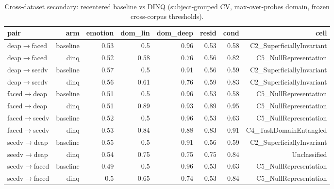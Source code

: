 \begin{table}[t]
\centering
\caption{Cross-dataset secondary: recentered baseline vs DINQ (subject-grouped CV, max-over-probes domain, frozen cross-corpus thresholds).}
\label{tab:xcorp}
\begin{tabular}{lrrrrrrr}
\toprule
pair & arm & emotion & dom\_lin & dom\_deep & resid & cond & cell \\
\midrule
deap$\rightarrow$faced & baseline & 0.53 & 0.5 & 0.96 & 0.53 & 0.58 & C2\_SuperficiallyInvariant \\
deap$\rightarrow$faced & dinq & 0.52 & 0.58 & 0.76 & 0.56 & 0.82 & C5\_NullRepresentation \\
deap$\rightarrow$seedv & baseline & 0.57 & 0.5 & 0.91 & 0.56 & 0.59 & C2\_SuperficiallyInvariant \\
deap$\rightarrow$seedv & dinq & 0.56 & 0.61 & 0.76 & 0.59 & 0.83 & C2\_SuperficiallyInvariant \\
faced$\rightarrow$deap & baseline & 0.51 & 0.5 & 0.96 & 0.53 & 0.58 & C5\_NullRepresentation \\
faced$\rightarrow$deap & dinq & 0.51 & 0.89 & 0.93 & 0.89 & 0.95 & C5\_NullRepresentation \\
faced$\rightarrow$seedv & baseline & 0.52 & 0.5 & 0.96 & 0.53 & 0.63 & C5\_NullRepresentation \\
faced$\rightarrow$seedv & dinq & 0.53 & 0.84 & 0.88 & 0.83 & 0.91 & C4\_TaskDomainEntangled \\
seedv$\rightarrow$deap & baseline & 0.55 & 0.5 & 0.91 & 0.56 & 0.59 & C2\_SuperficiallyInvariant \\
seedv$\rightarrow$deap & dinq & 0.54 & 0.75 & 0.75 & 0.75 & 0.84 & Unclassified \\
seedv$\rightarrow$faced & baseline & 0.49 & 0.5 & 0.96 & 0.53 & 0.63 & C5\_NullRepresentation \\
seedv$\rightarrow$faced & dinq & 0.5 & 0.65 & 0.74 & 0.53 & 0.84 & C5\_NullRepresentation \\
\bottomrule
\end{tabular}
\end{table}